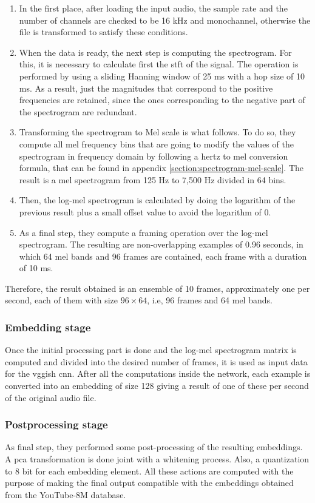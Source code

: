 	\begin{enumerate}
		\item In the first place, after loading the input audio, the sample rate and the number of channels are checked to be 16 kHz and monochannel, otherwise the file is transformed to satisfy these conditions.
		\item When the data is ready, the next step is computing the spectrogram. For this, it is necessary to calculate first the \acrfull{stft} of the signal. The operation is performed by using a sliding Hanning window of 25 ms with a hop size of 10 ms. As a result, just the magnitudes that correspond to the positive frequencies are retained, since the ones corresponding to the negative part of the spectrogram are redundant.
		\item  Transforming the spectrogram to Mel scale is what follows. To do so, they compute all mel frequency bins that are going to modify the values of the spectrogram in frequency domain by following a hertz to mel conversion formula, that can be found in appendix \ref{section:spectrogram-mel-scale}. The result is a mel spectrogram from 125 Hz to 7,500 Hz divided in 64 bins.
		\item Then, the log-mel spectrogram is calculated by doing the logarithm of the previous result plus a small offset value to avoid the logarithm of $0$.
		\item As a final step, they compute a framing operation over the log-mel spectrogram. The resulting are non-overlapping examples of 0.96 seconds, in which 64 mel bands and 96 frames are contained, each frame with a duration of 10 ms.
	\end{enumerate}

	Therefore, the result obtained is an ensemble of 10 frames, approximately one per second, each of them with size $96 \times 64$, i.e, 96 frames and 64 mel bands.

\subsubsection*{Embedding stage}

	Once the initial processing part is done and the log-mel spectrogram matrix is computed and divided into the desired number of frames, it is used as input data for the \acrshort{vgg}ish \acrshort{cnn}. After all the computations inside the network, each example is converted into an embedding of size 128 giving a result of one of these per second of the original audio file.

\subsubsection*{Postprocessing stage}

	As final step, they performed some post-processing of the resulting embeddings. A \acrfull{pca} \cite{Abdi2010} transformation is done joint with a whitening process. Also, a quantization to 8 bit for each embedding element. All these actions are computed with the purpose of making the final output compatible with the embeddings obtained from the YouTube-8M database.

